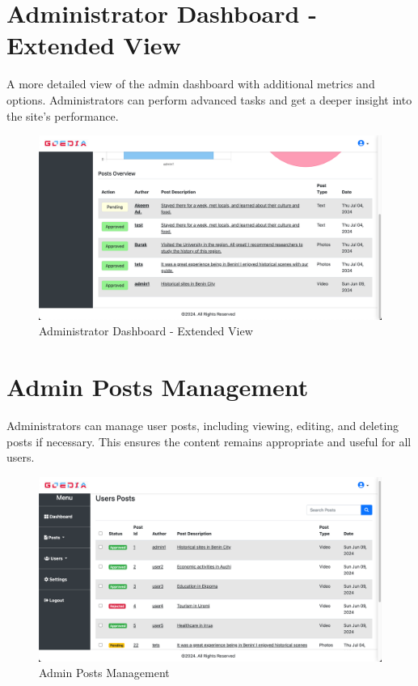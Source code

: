 \section{Administrator Dashboard - Extended View}
A more detailed view of the admin dashboard with additional metrics and options. Administrators can perform advanced tasks and get a deeper insight into the site's performance.

\begin{figure}[H]
    \centering
    \includegraphics[width=\textwidth]{adminDash2.png}
    \caption{Administrator Dashboard - Extended View}
    \label{fig:adminDash2}
\end{figure}

\section{Admin Posts Management}
Administrators can manage user posts, including viewing, editing, and deleting posts if necessary. This ensures the content remains appropriate and useful for all users.

\begin{figure}[H]
    \centering
    \includegraphics[width=\textwidth]{adminPOSTS.png}
    \caption{Admin Posts Management}
    \label{fig:adminPOSTS}
\end{figure}
